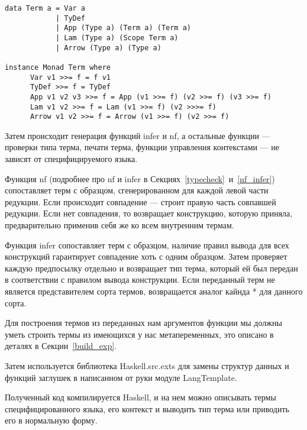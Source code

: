 \begin{lstlisting}[caption={Сгенерированное представление АСТ STLC на Haskell и представитель класса Monad},captionpos=b, frame=single, float, floatplacement=H, label={lst_gen_stlc}]
data Term a = Var a
            | TyDef
            | App (Type a) (Term a) (Term a)
            | Lam (Type a) (Scope Term a)
            | Arrow (Type a) (Type a)

instance Monad Term where
      Var v1 >>= f = f v1
      TyDef >>= f = TyDef
      App v1 v2 v3 >>= f = App (v1 >>= f) (v2 >>= f) (v3 >>= f)
      Lam v1 v2 >>= f = Lam (v1 >>= f) (v2 >>>= f)
      Arrow v1 v2 >>= f = Arrow (v1 >>= f) (v2 >>= f)
\end{lstlisting}

Затем происходит генерация функций infer и nf, а остальные функции --- проверки типа терма, печати терма, функции управления контекстами --- не зависят от специфицируемого языка.

\hfill

Функция nf (подробнее про nf и infer в Секциях~\ref{typecheck}~и~\ref{nf_infer}) сопоставляет терм с образцом, сгенерированном для каждой левой части редукции. Если происходит совпадение --- строит правую часть совпавшей редукции. Если нет совпадения, то возвращает конструкцию, которую приняла, предварительно применив себя же ко всем внутренним термам.

Функция infer сопоставляет терм с образцом, наличие правил вывода для всех конструкций гарантирует совпадение хоть с одним образцом. Затем проверяет каждую предпосылку отдельно и возвращает тип терма, который ей был передан в соответствии с правилом вывода конструкции. Если переданный терм не является представителем сорта термов, возвращается аналог кайнда * для данного сорта.

Для построения термов из переданных нам аргументов функции мы должны уметь строить термы из имеющихся у нас метапеременных, это описано в деталях в Секции~\ref{build_exp}.

Затем используется библиотека Haskell.src.exts\cite{src_exts} для замены структур данных и функций заглушек в написанном от руки модуле LangTemplate.

Полученный код компилируется Haskell, и на нем можно описывать термы специфицированного языка, его контекст и выводить тип терма или приводить его в нормальную форму.










